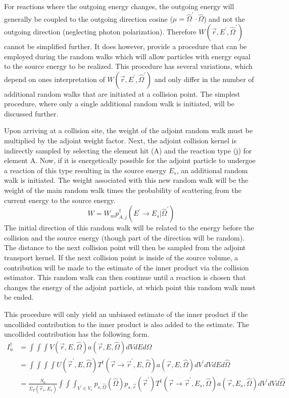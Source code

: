 For reactions where the outgoing energy changes, the outgoing energy will 
generally be coupled to the outgoing direction cosine 
($\mu = \hat{\Omega}^{'}\cdot\hat{\Omega}$) and not the outgoing direction 
(neglecting photon polarization). Therefore $W(\vec{r},E^{'},\hat{\Omega}^{'})$ 
cannot be simplified further. It does however, provide a procedure that
can be employed during the random walks which will allow particles with energy
equal to the source energy to be realized. This procedure has several
variations, which depend on ones interpretation of 
$W(\vec{r},E^{'},\hat{\Omega}^{'})$ and only differ in the number of additional
random walks that are initiated at a collision point. The simplest procedure, 
where only a single additional random walk is initiated, will be discussed 
further. 

Upon arriving at a collision site, the weight of the adjoint random
walk must be multiplied by the adjoint weight factor. Next, the adjoint
collision kernel is indirectly sampled by selecting the element hit (A) and
the reaction type (j) for element A. Now, if it is energetically 
possible for the adjoint particle to undergoe a reaction of this type resulting 
in the source energy $E_s$, an additional random walk is initiated. The weight
associated with this new random walk will be the weight of the main random
walk times the probability of scattering from the current energy to the
source energy. 
\begin{equation*}
  W = W_mp_{A,j}^{\dagger}(E^{'} \to E_s|\hat{\Omega}^{'}) 
\end{equation*}
The initial direction of this random walk will be related to the energy before
the collision and the source energy (though part of the direction will be 
random). The distance to the next collision point will then be sampled from
the adjoint transport kernel. If the next collision point is inside of the 
source volume, a contribution will be made to the estimate of the inner product
via the collision estimator. This random walk can then continue until a reaction
is chosen that changes the energy of the adjoint particle, at which point this
random walk must be ended. 

This procedure will only yield an unbiased estimate of the inner product if the 
uncollided contribution to the inner product is also added to the estimate. 
The uncollided contribution has the following form.
\begin{align}
  I_u^{\dagger} & = \int\int\int V(\vec{r},E,\hat{\Omega})
  a(\vec{r},E,\hat{\Omega}) dVdEd\hat{\Omega} \nonumber \\
  & = \int\int\int\int U(\vec{r}^{'},E,\hat{\Omega})
  T^{\dagger}(\vec{r} \to \vec{r}^{'},E,\hat{\Omega}) a(\vec{r},E,\hat{\Omega})
  dV^{'}dVdEd\hat{\Omega} \nonumber \\
  & = \frac{S_0}{\Sigma_T(\vec{r}_s,E_s)} \int\int\int_{V^{'} \in V_s} 
  p_{s,\hat{\Omega}}(\hat{\Omega}) p_{s,\vec{r}}(\vec{r}^{'})
  T^{\dagger}(\vec{r} \to \vec{r}^{'},E_s,\hat{\Omega}) a(\vec{r},E_s,\hat{\Omega})
  dV^{'}dVd\hat{\Omega} \nonumber
\end{align}

